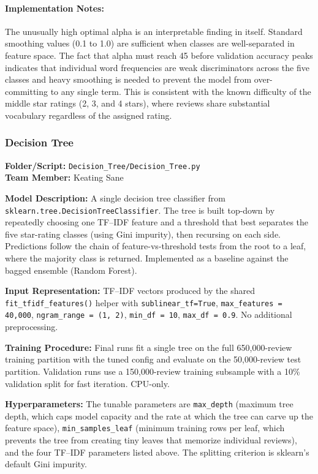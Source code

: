 \documentclass[12pt]{article}
\begin{document}
\paragraph{Implementation Notes:}
The unusually high optimal alpha is an interpretable finding in itself. Standard smoothing values (0.1 to 1.0) are sufficient when classes are well-separated in feature space. The fact that alpha must reach 45 before validation accuracy peaks indicates that individual word frequencies are weak discriminators across the five classes and heavy smoothing is needed to prevent the model from over-committing to any single term. This is consistent with the known difficulty of the middle star ratings (2, 3, and 4 stars), where reviews share substantial vocabulary regardless of the assigned rating.


\subsubsection{Decision Tree}
\textbf{Folder/Script:} \texttt{Decision\_Tree/Decision\_Tree.py}\\
\textbf{Team Member:} Keating Sane

\textbf{Model Description:} A single decision tree classifier from \texttt{sklearn.tree.DecisionTreeClassifier}. The tree is built top-down by repeatedly choosing one TF--IDF feature and a threshold that best separates the five star-rating classes (using Gini impurity), then recursing on each side. Predictions follow the chain of feature-vs-threshold tests from the root to a leaf, where the majority class is returned. Implemented as a baseline against the bagged ensemble (Random Forest).

\textbf{Input Representation:} TF--IDF vectors produced by the shared \texttt{fit\_tfidf\_features()} helper with \texttt{sublinear\_tf=True}, \texttt{max\_features = 40,000}, \texttt{ngram\_range = (1, 2)}, \texttt{min\_df = 10}, \texttt{max\_df = 0.9}. No additional preprocessing.

\textbf{Training Procedure:} Final runs fit a single tree on the full 650,000-review training partition with the tuned config and evaluate on the 50,000-review test partition. Validation runs use a 150,000-review training subsample with a 10\% validation split for fast iteration. CPU-only.

\textbf{Hyperparameters:} The tunable parameters are \texttt{max\_depth} (maximum tree depth, which caps model capacity and the rate at which the tree can carve up the feature space), \texttt{min\_samples\_leaf} (minimum training rows per leaf, which prevents the tree from creating tiny leaves that memorize individual reviews), and the four TF--IDF parameters listed above. The splitting criterion is sklearn's default Gini impurity.
\end{document}
